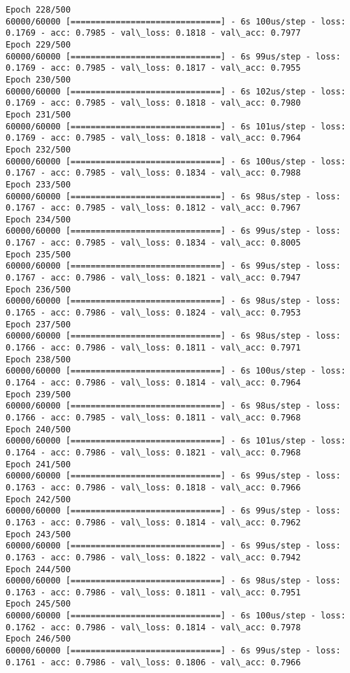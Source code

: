 \documentclass[11pt]{article}
\begin{document}
\begin{Verbatim}[commandchars=\\\{\}]
Epoch 228/500
60000/60000 [==============================] - 6s 100us/step - loss: 0.1769 - acc: 0.7985 - val\_loss: 0.1818 - val\_acc: 0.7977
Epoch 229/500
60000/60000 [==============================] - 6s 99us/step - loss: 0.1769 - acc: 0.7985 - val\_loss: 0.1817 - val\_acc: 0.7955
Epoch 230/500
60000/60000 [==============================] - 6s 102us/step - loss: 0.1769 - acc: 0.7985 - val\_loss: 0.1818 - val\_acc: 0.7980
Epoch 231/500
60000/60000 [==============================] - 6s 101us/step - loss: 0.1769 - acc: 0.7985 - val\_loss: 0.1818 - val\_acc: 0.7964
Epoch 232/500
60000/60000 [==============================] - 6s 100us/step - loss: 0.1767 - acc: 0.7985 - val\_loss: 0.1834 - val\_acc: 0.7988
Epoch 233/500
60000/60000 [==============================] - 6s 98us/step - loss: 0.1767 - acc: 0.7985 - val\_loss: 0.1812 - val\_acc: 0.7967
Epoch 234/500
60000/60000 [==============================] - 6s 99us/step - loss: 0.1767 - acc: 0.7985 - val\_loss: 0.1834 - val\_acc: 0.8005
Epoch 235/500
60000/60000 [==============================] - 6s 99us/step - loss: 0.1767 - acc: 0.7986 - val\_loss: 0.1821 - val\_acc: 0.7947
Epoch 236/500
60000/60000 [==============================] - 6s 98us/step - loss: 0.1765 - acc: 0.7986 - val\_loss: 0.1824 - val\_acc: 0.7953
Epoch 237/500
60000/60000 [==============================] - 6s 98us/step - loss: 0.1766 - acc: 0.7986 - val\_loss: 0.1811 - val\_acc: 0.7971
Epoch 238/500
60000/60000 [==============================] - 6s 100us/step - loss: 0.1764 - acc: 0.7986 - val\_loss: 0.1814 - val\_acc: 0.7964
Epoch 239/500
60000/60000 [==============================] - 6s 98us/step - loss: 0.1766 - acc: 0.7985 - val\_loss: 0.1811 - val\_acc: 0.7968
Epoch 240/500
60000/60000 [==============================] - 6s 101us/step - loss: 0.1764 - acc: 0.7986 - val\_loss: 0.1821 - val\_acc: 0.7968
Epoch 241/500
60000/60000 [==============================] - 6s 99us/step - loss: 0.1763 - acc: 0.7986 - val\_loss: 0.1818 - val\_acc: 0.7966
Epoch 242/500
60000/60000 [==============================] - 6s 99us/step - loss: 0.1763 - acc: 0.7986 - val\_loss: 0.1814 - val\_acc: 0.7962
Epoch 243/500
60000/60000 [==============================] - 6s 99us/step - loss: 0.1763 - acc: 0.7986 - val\_loss: 0.1822 - val\_acc: 0.7942
Epoch 244/500
60000/60000 [==============================] - 6s 98us/step - loss: 0.1763 - acc: 0.7986 - val\_loss: 0.1811 - val\_acc: 0.7951
Epoch 245/500
60000/60000 [==============================] - 6s 100us/step - loss: 0.1762 - acc: 0.7986 - val\_loss: 0.1814 - val\_acc: 0.7978
Epoch 246/500
60000/60000 [==============================] - 6s 99us/step - loss: 0.1761 - acc: 0.7986 - val\_loss: 0.1806 - val\_acc: 0.7966

\end{Verbatim}
\end{document}
